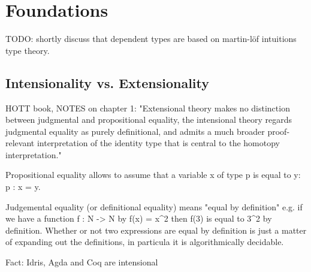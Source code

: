 \section{Foundations}
TODO: shortly discuss that dependent types are based on martin-löf intuitions type theory.

\subsection{Intensionality vs. Extensionality}
HOTT book, NOTES on chapter 1: "Extensional theory makes no distinction between judgmental and propositional equality, the intensional theory regards judgmental equality as purely definitional, and admits a much broader proof-relevant interpretation of the identity type that is central to the homotopy interpretation."

Propositional equality allows to assume that a variable x of type p is equal to y: p : x = y.

Judgemental equality (or definitional equality) means "equal by definition" e.g. if we have a function f : N -> N by f(x) = x^2 then f(3) is equal to 3^2 by definition. Whether or not two expressions are equal by definition is just a matter of expanding out the definitions, in particula it is algorithmically decidable.

Fact: Idris, Agda and Coq are intensional
